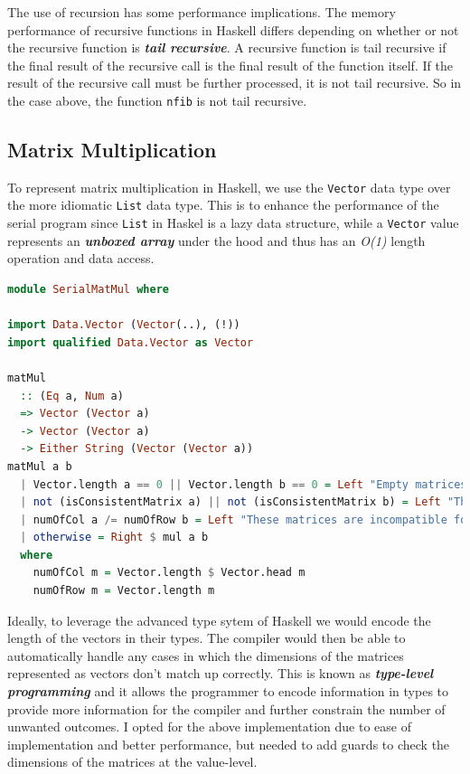 \documentclass[a4paper, 10pt]{article}
\begin{document}
The use of recursion has some performance implications. The memory performance of recursive functions in Haskell differs depending on whether or not the recursive function is \textbf{\textit{tail recursive}}. A recursive function is tail recursive if the final result of the recursive call is the final result of the function itself. If the result of the recursive call must be further processed, it is not tail recursive. So in the case above, the function \lstinline{nfib} is not tail recursive.

\subsection{Matrix Multiplication}

To represent matrix multiplication in Haskell, we use the \lstinline{Vector} data type over the more idiomatic \lstinline{List} data type. This is to enhance the performance of the serial program since \lstinline{List} in Haskel is a lazy data structure,  while a \lstinline{Vector} value represents an \textbf{\textit{unboxed array}} under the hood and thus has an \textit{O(1)} length operation and data access.

\begin{lstlisting}[language=Haskell, caption=Haskell MatMul]
module SerialMatMul where

import Data.Vector (Vector(..), (!))
import qualified Data.Vector as Vector

matMul
  :: (Eq a, Num a)
  => Vector (Vector a)
  -> Vector (Vector a)
  -> Either String (Vector (Vector a))
matMul a b
  | Vector.length a == 0 || Vector.length b == 0 = Left "Empty matrices can't be used"
  | not (isConsistentMatrix a) || not (isConsistentMatrix b) = Left "The dimensions of the matrices are inconsistent"
  | numOfCol a /= numOfRow b = Left "These matrices are incompatible for multiplication"
  | otherwise = Right $ mul a b
  where
    numOfCol m = Vector.length $ Vector.head m
    numOfRow m = Vector.length m
\end{lstlisting}

Ideally, to leverage the advanced type sytem of Haskell we would encode the length of the vectors in their types. The compiler would then be able to automatically handle any cases in which the dimensions of the matrices represented as vectors don't match up correctly. This is known as \textbf{\textit{type-level programming}} and it allows the programmer to encode information in types to provide more information for the compiler and further constrain the number of unwanted outcomes. I opted for the above implementation due to ease of implementation and better performance, but needed to add guards to check the dimensions of the matrices at the value-level.
\end{document}
